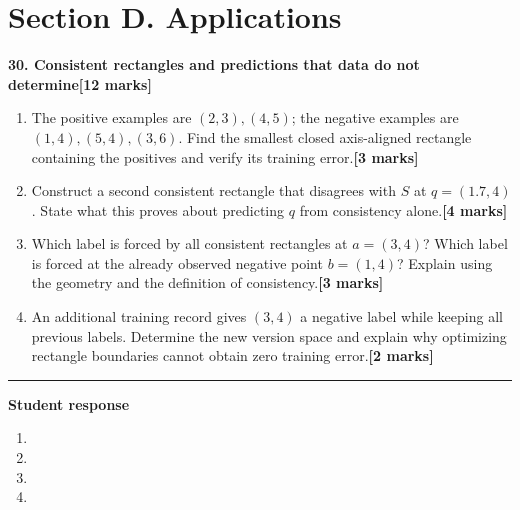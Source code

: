 \documentclass[11pt,a4paper]{article}
\newlength{\BlankAnswerHeight}\setlength{\BlankAnswerHeight}{16mm}
\newcommand{\AnswerBlank}{\leavevmode\par\vspace{\BlankAnswerHeight}}
\begin{document}
\newpage\section*{Section D. Applications}
\textbf{30. Consistent rectangles and predictions that data do not determine}\hfill\textbf{[12 marks]}\par\medskip
\begin{enumerate}[label=(\alph*),leftmargin=8mm,itemsep=3pt]
\item The positive examples are \((2,3),(4,5)\); the negative examples are \((1,4),(5,4),(3,6)\). Find the smallest closed axis-aligned rectangle containing the positives and verify its training error.\hfill\textbf{[3 marks]}
\item Construct a second consistent rectangle that disagrees with \(S\) at \(q=(1.7,4)\). State what this proves about predicting \(q\) from consistency alone.\hfill\textbf{[4 marks]}
\item Which label is forced by all consistent rectangles at \(a=(3,4)\)? Which label is forced at the already observed negative point \(b=(1,4)\)? Explain using the geometry and the definition of consistency.\hfill\textbf{[3 marks]}
\item An additional training record gives \((3,4)\) a negative label while keeping all previous labels. Determine the new version space and explain why optimizing rectangle boundaries cannot obtain zero training error.\hfill\textbf{[2 marks]}
\end{enumerate}\par\medskip\hrule\medskip\textbf{Student response}\par
\begin{enumerate}[label=(\alph*),leftmargin=8mm,itemsep=3pt]
\item
\AnswerBlank
\item
\AnswerBlank
\item
\AnswerBlank
\item
\AnswerBlank
\end{enumerate}
\end{document}
